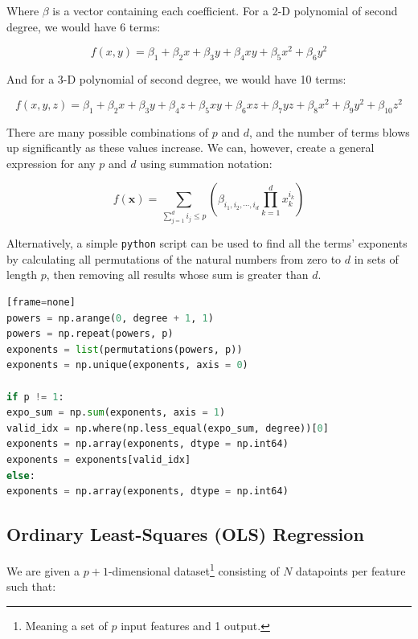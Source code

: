 \documentclass[a4paper,10pt,english]{article}
\begin{document}
Where $\beta$ is a vector containing each coefficient.	For a 2-D polynomial of second degree, we would have 6 terms:

\begin{equation*}
f(x,y) = \beta_1 + \beta_2 x + \beta_3 y + \beta_4 xy + \beta_5 x^2 + \beta_6 y^2
\end{equation*}

And for a 3-D polynomial of second degree, we would have 10 terms:

\begin{equation*}
f(x,y,z) = \beta_1 + \beta_2 x + \beta_3 y + \beta_4 z + \beta_5 xy + \beta_6 xz + \beta_7 yz + \beta_8 x^2 + \beta_9 y^2 + \beta_{10} z^2
\end{equation*}

There are many possible combinations of $p$ and $d$, and the number of terms blows up significantly as these values increase.  We can, however, create a general expression \cite{2482654} for any $p$ and $d$ using summation notation:

\begin{equation}
\label{eq_method_0}
f(\mathbf{x}) = \sum_{\sum_{j = 1}^d i_j \leq p} \left( \beta_{i_1, i_2, \cdots, i_d} \prod_{k = 1}^d x_k^{i_k} \right)
\end{equation}

Alternatively, a simple \texttt{python} script can be used to find all the terms' exponents by calculating all permutations of the natural numbers from zero to $d$ in sets of length $p$, then removing all results whose sum is greater than $d$.

\begin{lstlisting}[showstringspaces=false,language=Python,firstnumber = 1][frame=none]
powers = np.arange(0, degree + 1, 1)
powers = np.repeat(powers, p)
exponents = list(permutations(powers, p))
exponents = np.unique(exponents, axis = 0)

if p != 1:
expo_sum = np.sum(exponents, axis = 1)
valid_idx = np.where(np.less_equal(expo_sum, degree))[0]
exponents = np.array(exponents, dtype = np.int64)
exponents = exponents[valid_idx]
else:
exponents = np.array(exponents, dtype = np.int64)
\end{lstlisting}


\subsection{Ordinary Least-Squares (OLS) Regression}

We are given a $p+1$-dimensional dataset\footnote{Meaning a set of $p$ input features and 1 output.} consisting of $N$ datapoints per feature such that:
\end{document}
